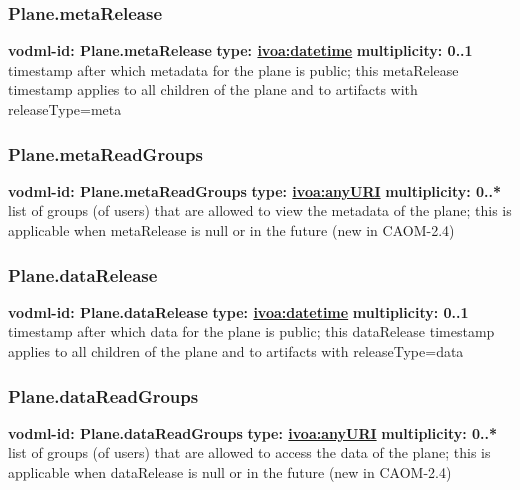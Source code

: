     \subsubsection{Plane.metaRelease}
      \textbf{vodml-id: Plane.metaRelease} \newline
      \textbf{type: \hyperref[sect:ivoa]{ivoa:datetime}} \newline
      \textbf{multiplicity: 0..1} \newline
      timestamp after which metadata for the plane is public; this metaRelease timestamp applies to all children of the plane and to artifacts with releaseType=meta

    \subsubsection{Plane.metaReadGroups}
      \textbf{vodml-id: Plane.metaReadGroups} \newline
      \textbf{type: \hyperref[sect:ivoa]{ivoa:anyURI}} \newline
      \textbf{multiplicity: 0..*} \newline
      list of groups (of users) that are allowed to view the metadata of the plane; this is applicable when metaRelease is null or in the future (new in CAOM-2.4)

    \subsubsection{Plane.dataRelease}
      \textbf{vodml-id: Plane.dataRelease} \newline
      \textbf{type: \hyperref[sect:ivoa]{ivoa:datetime}} \newline
      \textbf{multiplicity: 0..1} \newline
      timestamp after which data for the plane is public; this dataRelease timestamp applies to all children of the plane and to artifacts with releaseType=data

    \subsubsection{Plane.dataReadGroups}
      \textbf{vodml-id: Plane.dataReadGroups} \newline
      \textbf{type: \hyperref[sect:ivoa]{ivoa:anyURI}} \newline
      \textbf{multiplicity: 0..*} \newline
      list of groups (of users) that are allowed to access the data of the plane; this is applicable when dataRelease is null or in the future (new in CAOM-2.4)

